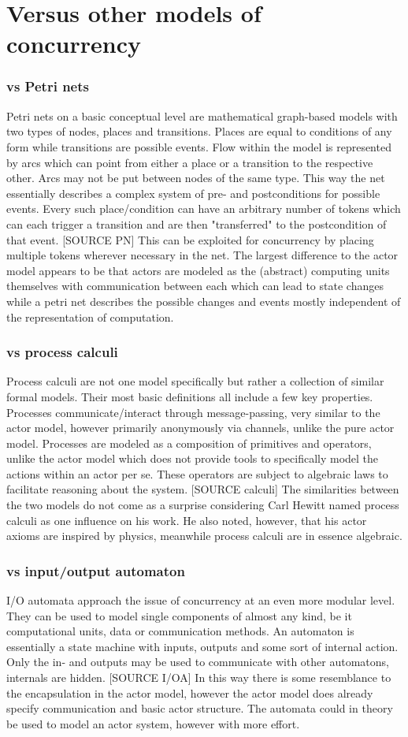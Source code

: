 \documentclass[A4]{article}
\begin{document}
\section{Versus other models of concurrency}
\subsubsection{vs Petri nets}
Petri nets on a basic conceptual level are mathematical graph-based models with two types of nodes, places and transitions. Places are equal to conditions of any form while transitions are possible events. Flow within the model is represented by arcs which can point from either a place or a transition to the respective other. Arcs may not be put between nodes of the same type. This way the net essentially describes a complex system of pre- and postconditions for possible events. Every such place/condition can have an arbitrary number of tokens which can each trigger a transition and are then "transferred" to the postcondition of that event. [SOURCE PN]
This can be exploited for concurrency by placing multiple tokens wherever necessary in the net. 
The largest difference to the actor model appears to be that actors are modeled as the (abstract) computing units themselves with communication between each which can lead to state changes while a petri net describes the possible changes and events mostly independent of the representation of computation.
\subsubsection{vs process calculi}
Process calculi are not one model specifically but rather a collection of similar formal models. Their most basic definitions all include a few key properties. Processes communicate/interact through message-passing, very similar to the actor model, however primarily anonymously via channels, unlike the pure actor model. Processes are modeled as a composition of primitives and operators, unlike the actor model which does not provide tools to specifically model the actions within an actor per se. These operators are subject to algebraic laws to facilitate reasoning about the system. [SOURCE calculi] The similarities between the two models do not come as a surprise considering Carl Hewitt named process calculi as one influence on his work. He also noted, however, that his actor axioms are inspired by physics, meanwhile process calculi are in essence algebraic.
\subsubsection{vs input/output automaton}
I/O automata approach the issue of concurrency at an even more modular level. They can be used to model single components of almost any kind, be it computational units, data or communication methods. An automaton is essentially a state machine with inputs, outputs and some sort of internal action. Only the in- and outputs may be used to communicate with other automatons, internals are hidden. [SOURCE I/OA]
In this way there is some resemblance to the encapsulation in the actor model, however the actor model does already specify communication and basic actor structure. The automata could in theory be used to model an actor system, however with more effort.
\end{document}
